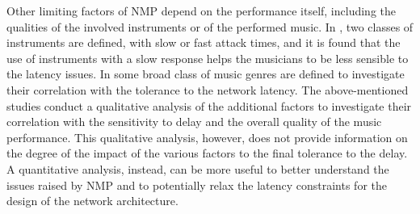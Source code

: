 
Other limiting factors of NMP depend on the performance itself, including the qualities of the involved instruments or of the performed music. In \cite{barbosa2011influence}, two classes of instruments are defined, with slow or fast attack times, and it is found that the use of instruments with a slow response helps the musicians to be less sensible to the latency issues. In \cite{Chew2004} some broad class of music genres are defined to investigate their correlation with the tolerance to the network latency. The above-mentioned studies conduct a qualitative analysis of the additional factors to investigate their correlation with the sensitivity to delay and the overall quality of the music performance. This qualitative analysis, however, does not provide information on the degree of the impact of the various factors to the final tolerance to the delay. A quantitative analysis, instead, can be more useful to better understand the issues raised by NMP and to potentially relax the latency constraints for the design of the network architecture. 

